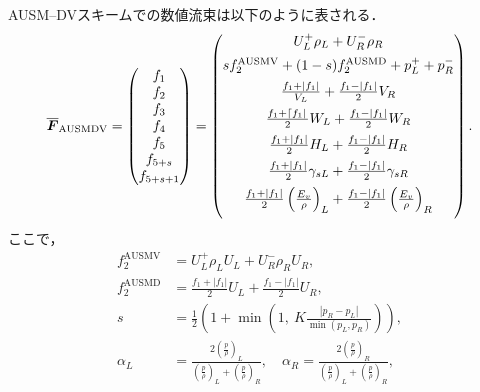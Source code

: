 AUSM–DVスキームでの数値流束は以下のように表される．
\begin{equation}
\label{eq:ausmdv}
\overline{\boldsymbol{F}}_\mathrm{AUSMDV}=\begin{pmatrix}
f_{1} \\
f_{2} \\
f_{3} \\
f_{4} \\
f_{5} \\
f_{5+s} \\
f_{5+s+1}
\end{pmatrix}=\begin{pmatrix}
U_{L}^{+} \rho_{L}+U_{R}^{-} \rho_{R} \vspace{5pt} \\
s f_{2}^\mathrm{AUSMV}+(1-s) f_{2}^\mathrm{AUSMD}+p_{L}^{+}+p_{R}^{-} \vspace{5pt} \\
\frac{f_{1}+\left|f_{1}\right|}{V_{L}}+\frac{f_{1}-\left|f_{1}\right|}{2} V_{R} \vspace{5pt} \\
\frac{f_{1}+\left\lceil f_{1} |\right.}{2} W_{L}+\frac{f_{1}-\left|f_{1}\right|}{2} W_{R} \vspace{5pt} \\
\frac{f_{1}+\left|f_{1}\right|}{2} H_{L}+\frac{f_{1}-\left|f_{1}\right|}{2} H_{R} \vspace{5pt} \\
\frac{f_{1}+\left|f_{1}\right|}{2} \gamma_{s L}+\frac{f_{1}-\left|f_{1}\right|}{2} \gamma_{s R} \vspace{5pt} \\
\frac{f_{1}+\left|f_{1}\right|}{2}\left(\frac{E_v}{\rho}\right)_{L}+\frac{f_{1}-\left|f_{1}\right|}{2}\left(\frac{E_v}{\rho}\right)_{R} \vspace{5pt}
\end{pmatrix}.
\end{equation}
ここで，
\begin{align}
f_{2}^\mathrm{AUSMV}&=U_{L}^{+} \rho_{L} U_{L}+U_{R}^{-} \rho_{R} U_{R}, \\
f_{2}^\mathrm{A U S M D}&=\frac{f_{1}+\left|f_{1}\right|}{2} U_{L}+\frac{f_{1}-\left|f_{1}\right|}{2} U_{R}, \\
s&=\frac{1}{2}\left(1+\min \left(1,\ K \frac{\left|p_{R}-p_{L}\right|}{\min \left(p_{L}, p_{R}\right)}\right)\right), \\
\alpha_{L}&=\frac{2\left(\frac{p}{\rho}\right)_{L}}{\left(\frac{p}{\rho}\right)_{L}+\left(\frac{p}{\rho}\right)_{R}}, \quad \alpha_{R}=\frac{2\left(\frac{p}{\rho}\right)_{R}}{\left(\frac{p}{\rho}\right)_{L}+\left(\frac{p}{\rho}\right)_{R}},
\end{align}
